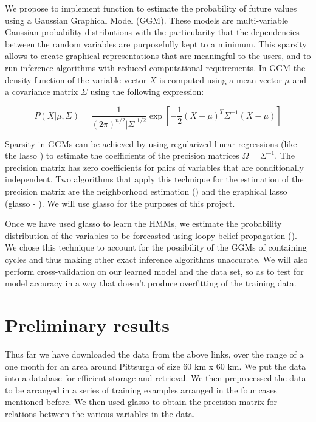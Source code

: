 \documentclass{article}
\begin{document}
We propose to implement function to estimate the probability
of future values using a Gaussian Graphical Model (GGM). These models are
multi-variable Gaussian probability distributions with the particularity that
the dependencies between the random variables are purposefully kept to a
minimum. This sparsity allows to create graphical representations that
are meaningful to the users, and to run inference algorithms with reduced
computational requirements. In GGM the density function of the variable vector
$X$ is computed using a mean vector $\mu$ and a covariance matrix $\Sigma$
using the following expression:

\begin{equation}
\label{eq:gaussian}
P(X|\mu,\Sigma) =
\frac{1}{(2\pi)^{n/2}\vert\Sigma\vert^{1/2}}\exp[-\frac{1}{2}(X - \mu)^T\Sigma^{-1}(X - \mu)]
\end{equation}

Sparsity in GGMs can be achieved by using regularized linear regressions (like
the lasso \cite{tibshirani1996}) to estimate the coefficients of the precision
matrices $\Omega=\Sigma^{-1}$. The precision matrix has zero coefficients for
pairs of variables that are conditionally independent. Two algorithms that apply
this technique for the estimation of the precision matrix are the
neighborhood estimation (\cite{meinshausen2006}) and the graphical lasso
(glasso - \cite{friedman2008}). We will use glasso for the purposes of this
project.

Once we have used glasso to learn the HMMs, we estimate the probability
distribution of the variables to be forecasted using loopy belief
propagation (\cite{murphy1999}). We chose this technique to account for the
possibility of the GGMs of containing cycles and thus making other exact
inference algorithms unaccurate. We will also perform cross-validation on our
learned model and the data set, so as to test for model accuracy in a way that
doesn't produce overfitting of the training data.

\section{Preliminary results}

Thus far we have downloaded the data from the above links, over the range of a
one month for an area around Pittsurgh of size 60 km x 60 km. We put the data
into a database for efficient storage and retrieval. We then preprocessed the
data to be arranged in a series of training examples arranged in the four cases
mentioned before. We then used glasso to obtain the precision matrix for
relations between the various variables in the data.
\end{document}
